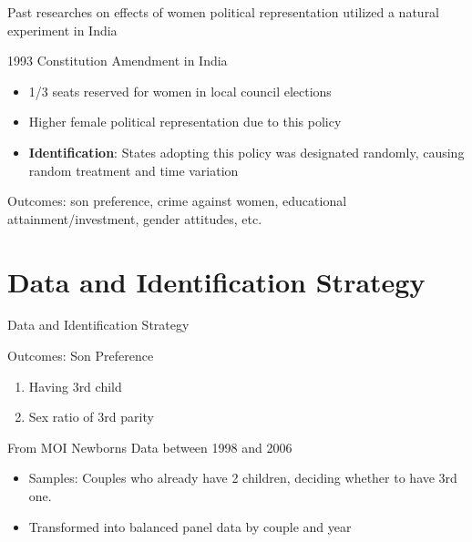 \documentclass[
  10pt,
  ignorenonframetext,
  aspectratio=43,
]{beamer}
\providecommand{\tightlist}{%
  \setlength{\itemsep}{0pt}\setlength{\parskip}{0pt}}
\begin{document}
\begin{frame}
Past researches on effects of women political representation utilized a
natural experiment in India

\begin{block}{1993 Constitution Amendment in India}
\protect\hypertarget{constitution-amendment-in-india}{}
\begin{itemize}
\tightlist
\item
  1/3 seats reserved for women in local council elections
\item
  Higher female political representation due to this policy
\item
  \textbf{Identification}: States adopting this policy was designated
  randomly, causing random treatment and time variation
\end{itemize}

Outcomes: son preference, crime against women, educational
attainment/investment, gender attitudes, etc.
\end{block}
\end{frame}

\hypertarget{data-and-identification-strategy}{%
\section{Data and Identification
Strategy}\label{data-and-identification-strategy}}

\begin{frame}{Data and Identification Strategy}
\begin{block}{Outcomes: Son Preference}
\protect\hypertarget{outcomes-son-preference}{}
\begin{enumerate}
\tightlist
\item
  Having 3rd child
\item
  Sex ratio of 3rd parity
\end{enumerate}

From MOI Newborns Data between 1998 and 2006

\begin{itemize}
\tightlist
\item
  Samples: Couples who already have 2 children, deciding whether to have
  3rd one.
\item
  Transformed into balanced panel data by couple and year
\end{itemize}
\end{block}
\end{frame}
\end{document}
